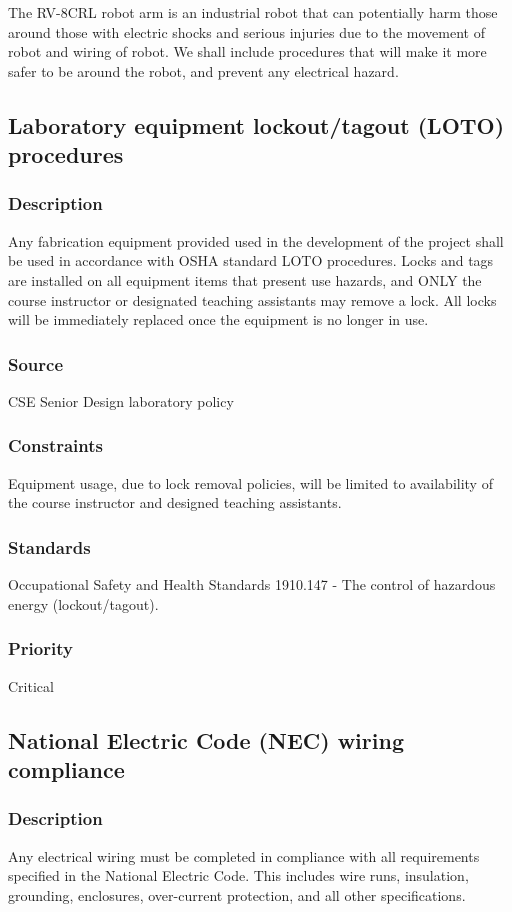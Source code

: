 The RV-8CRL robot arm is an industrial robot that can potentially harm those around those with electric shocks and serious injuries due to the movement of robot and wiring of robot. We shall include procedures that will make it more safer to be around the robot, and prevent any electrical hazard.

\subsection{Laboratory equipment lockout/tagout (LOTO) procedures}
\subsubsection{Description}
Any fabrication equipment provided used in the development of the project shall be used in accordance with OSHA standard LOTO procedures. Locks and tags are installed on all equipment items that present use hazards, and ONLY the course instructor or designated teaching assistants may remove a lock. All locks will be immediately replaced once the equipment is no longer in use.
\subsubsection{Source}
CSE Senior Design laboratory policy
\subsubsection{Constraints}
Equipment usage, due to lock removal policies, will be limited to availability of the course instructor and designed teaching assistants.
\subsubsection{Standards}
Occupational Safety and Health Standards 1910.147 - The control of hazardous energy (lockout/tagout).
\subsubsection{Priority}
Critical

\subsection{National Electric Code (NEC) wiring compliance}
\subsubsection{Description}
Any electrical wiring must be completed in compliance with all requirements specified in the National Electric Code. This includes wire runs, insulation, grounding, enclosures, over-current protection, and all other specifications.
